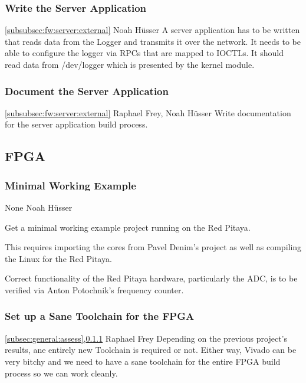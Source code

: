 \documentclass[a4paper,oneside]{alpenspecs/alpenspecs}
\begin{document}
\subsubsection{Write the Server Application}
\label{subsubsec:fw:server:server}
\wpac
    {}
    {}
    {}
    {\ref{subsubsec:fw:server:external}}
    {}
    {Noah H\"usser}
    {%
        A server application has to be written that reads data from the Logger and transmits it over the network.
        It needs to be able to configure the logger via RPCs that are mapped to IOCTLs.
        It should read data from /dev/logger which is presented by the kernel module.
    }

\subsubsection{Document the Server Application}
\label{subsubsec:fw:server:docs}
\wpac
    {}
    {}
    {}
    {\ref{subsubsec:fw:server:external}}
    {}
    {Raphael Frey, Noah H\"usser}
    {%
        Write documentation for the server application build process.
    }

\subsection{FPGA}
\label{subsec:fw:fpga}

\subsubsection{Minimal Working Example}
\label{subsubsec:fw:fpga:mwe}
\wpac
    {}
    {}
    {}
    {None}
    {}
    {Noah H\"usser}
    {%
        Get a minimal working example project running on the Red Pitaya.

        This requires importing the cores from Pavel Denim's project as
        well as compiling the Linux for the Red Pitaya.

        Correct functionality of the Red Pitaya hardware, particularly the
        ADC, is to be verified via Anton Potochnik's frequency counter.
    }

\subsubsection{Set up a Sane Toolchain for the FPGA}
\label{subsubsec:fw:fpga:sane}

\wpac
    {}
    {}
    {}
    {\ref{subsec:general:assess},\ref{subsubsec:fw:fpga:mwe}}
    {}
    {Raphael Frey}
    {%
        Depending on the previous project's results, ane entirely new Toolchain is required or not. Either way, Vivado can be very bitchy and we need to have a sane toolchain for the entire FPGA build process so we can work cleanly.
    }
\end{document}
